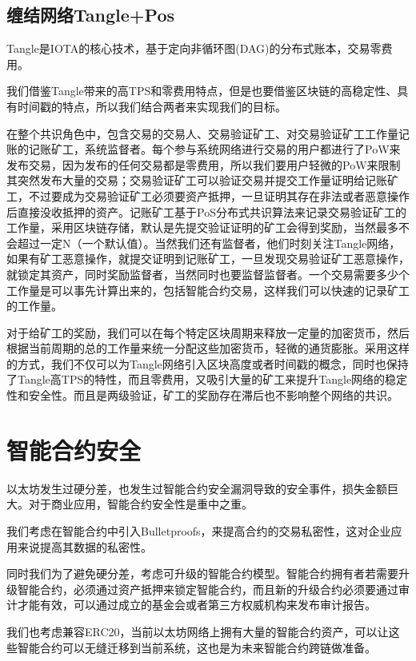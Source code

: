 \documentclass[UTF8]{ctexart}
\begin{document}
\subsection{缠结网络Tangle+Pos}

Tangle是IOTA的核心技术，基于定向非循环图(DAG)的分布式账本，交易零费用。

我们借鉴Tangle带来的高TPS和零费用特点，但是也要借鉴区块链的高稳定性、具有时间戳的特点，所以我们结合两者来实现我们的目标。

在整个共识角色中，包含交易的交易人、交易验证矿工、对交易验证矿工工作量记账的记账矿工，系统监督者。每个参与系统网络进行交易的用户都进行了PoW来发布交易，因为发布的任何交易都是零费用，所以我们要用户轻微的PoW来限制其突然发布大量的交易；交易验证矿工可以验证交易并提交工作量证明给记账矿工，不过要成为交易验证矿工必须要资产抵押，一旦证明其存在非法或者恶意操作后直接没收抵押的资产。记账矿工基于PoS分布式共识算法来记录交易验证矿工的工作量，采用区块链存储，默认是先提交验证证明的矿工会得到奖励，当然最多不会超过一定N（一个默认值）。当然我们还有监督者，他们时刻关注Tangle网络，如果有矿工恶意操作，就提交证明到记账矿工，一旦发现交易验证矿工恶意操作，就锁定其资产，同时奖励监督者，当然同时也要监督监督者。一个交易需要多少个工作量是可以事先计算出来的，包括智能合约交易，这样我们可以快速的记录矿工的工作量。

对于给矿工的奖励，我们可以在每个特定区块周期来释放一定量的加密货币，然后根据当前周期的总的工作量来统一分配这些加密货币，轻微的通货膨胀。采用这样的方式，我们不仅可以为Tangle网络引入区块高度或者时间戳的概念，同时也保持了Tangle高TPS的特性，而且零费用，又吸引大量的矿工来提升Tangle网络的稳定性和安全性。而且是两级验证，矿工的奖励存在滞后也不影响整个网络的共识。

\section{智能合约安全}

以太坊发生过硬分差，也发生过智能合约安全漏洞导致的安全事件，损失金额巨大。对于商业应用，智能合约安全性是重中之重。

我们考虑在智能合约中引入Bulletproofs，来提高合约的交易私密性，这对企业应用来说提高其数据的私密性。

同时我们为了避免硬分差，考虑可升级的智能合约模型。智能合约拥有者若需要升级智能合约，必须通过资产抵押来锁定智能合约，而且新的升级合约必须要通过审计才能有效，可以通过成立的基金会或者第三方权威机构来发布审计报告。

我们也考虑兼容ERC20，当前以太坊网络上拥有大量的智能合约资产，可以让这些智能合约可以无缝迁移到当前系统，这也是为未来智能合约跨链做准备。
\end{document}
